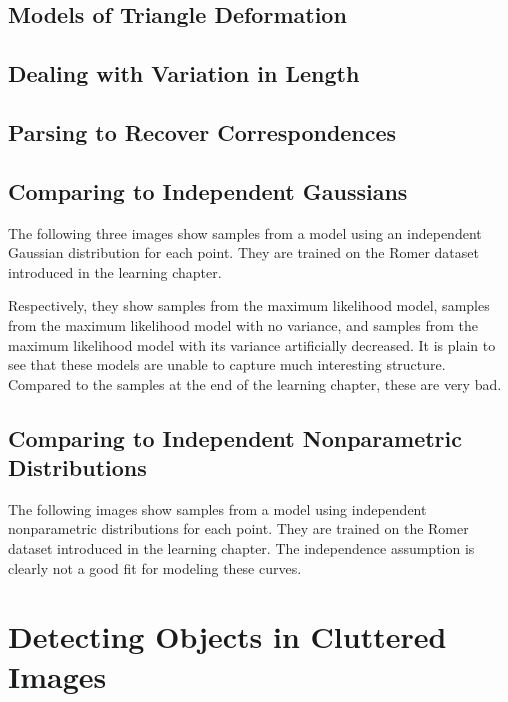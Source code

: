 \documentclass{book}
\begin{document}
  \section{Models of Triangle Deformation}
    \label{sec-models-triangle}
    

  \section{Dealing with Variation in Length}
    \label{sec-models-dirichlet}
    

  \section{Parsing to Recover Correspondences}
    \label{sec-models-parsing}
    

  \section{Comparing to Independent Gaussians}
  The following three images show samples from a model using an
  independent Gaussian distribution for each point. They are trained
  on the Romer dataset introduced in the learning chapter.

  Respectively, they show samples from the maximum likelihood model,
  samples from the maximum likelihood model with no variance, and
  samples from the maximum likelihood model with its variance
  artificially decreased. It is plain to see that these models are
  unable to capture much interesting structure. Compared to the
  samples at the end of the learning chapter, these are very bad.

    

  \section{Comparing to Independent Nonparametric Distributions}
  The following images show samples from a model using independent
  nonparametric distributions for each point. They are trained on the
  Romer dataset introduced in the learning chapter. The independence
  assumption is clearly not a good fit for modeling these curves.    

    


\chapter{Detecting Objects in Cluttered Images}
  \label{chap-detection}
\end{document}

